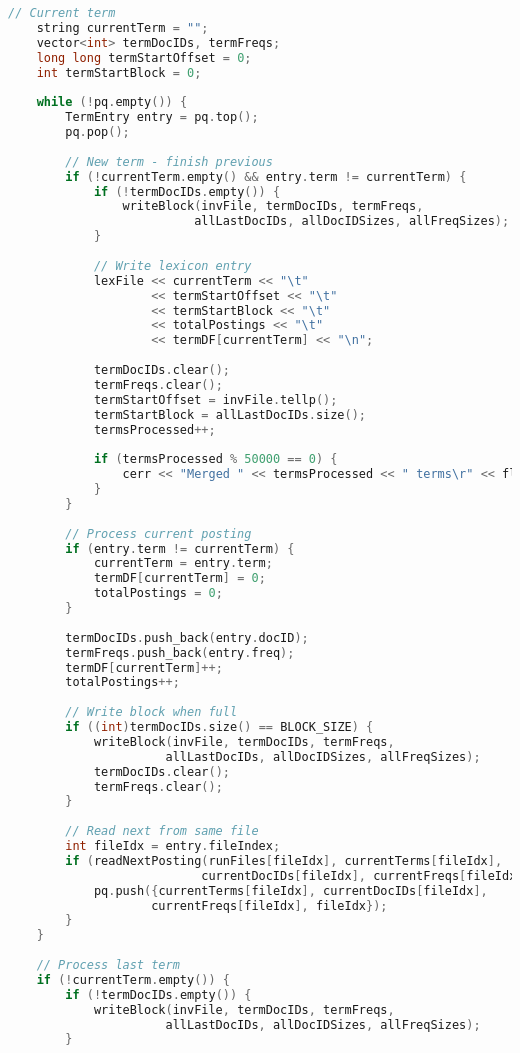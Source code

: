 \documentclass[11pt, a4paper]{report}
\begin{document}
\begin{lstlisting}[language=C++, caption={The complete source code for the merger component.}, label={lst:merger}]
    // Current term
    string currentTerm = "";
    vector<int> termDocIDs, termFreqs;
    long long termStartOffset = 0;
    int termStartBlock = 0;
    
    while (!pq.empty()) {
        TermEntry entry = pq.top();
        pq.pop();
        
        // New term - finish previous
        if (!currentTerm.empty() && entry.term != currentTerm) {
            if (!termDocIDs.empty()) {
                writeBlock(invFile, termDocIDs, termFreqs, 
                          allLastDocIDs, allDocIDSizes, allFreqSizes);
            }
            
            // Write lexicon entry
            lexFile << currentTerm << "\t" 
                    << termStartOffset << "\t"
                    << termStartBlock << "\t"
                    << totalPostings << "\t"
                    << termDF[currentTerm] << "\n";
            
            termDocIDs.clear();
            termFreqs.clear();
            termStartOffset = invFile.tellp();
            termStartBlock = allLastDocIDs.size();
            termsProcessed++;
            
            if (termsProcessed % 50000 == 0) {
                cerr << "Merged " << termsProcessed << " terms\r" << flush;
            }
        }
        
        // Process current posting
        if (entry.term != currentTerm) {
            currentTerm = entry.term;
            termDF[currentTerm] = 0;
            totalPostings = 0;
        }
        
        termDocIDs.push_back(entry.docID);
        termFreqs.push_back(entry.freq);
        termDF[currentTerm]++;
        totalPostings++;
        
        // Write block when full
        if ((int)termDocIDs.size() == BLOCK_SIZE) {
            writeBlock(invFile, termDocIDs, termFreqs,
                      allLastDocIDs, allDocIDSizes, allFreqSizes);
            termDocIDs.clear();
            termFreqs.clear();
        }
        
        // Read next from same file
        int fileIdx = entry.fileIndex;
        if (readNextPosting(runFiles[fileIdx], currentTerms[fileIdx], 
                           currentDocIDs[fileIdx], currentFreqs[fileIdx])) {
            pq.push({currentTerms[fileIdx], currentDocIDs[fileIdx], 
                    currentFreqs[fileIdx], fileIdx});
        }
    }
    
    // Process last term
    if (!currentTerm.empty()) {
        if (!termDocIDs.empty()) {
            writeBlock(invFile, termDocIDs, termFreqs,
                      allLastDocIDs, allDocIDSizes, allFreqSizes);
        }
        

\end{lstlisting}
\end{document}
